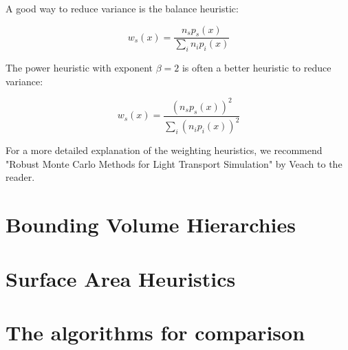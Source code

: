 A good way to reduce variance is the balance heuristic:

\begin{equation}
w_s(x) = \frac{n_s p_s(x)}{\sum_{i}n_i p_i(x)}
\end{equation}

The power heuristic with exponent $\beta = 2$ is often a better heuristic to reduce variance:

\begin{equation}
w_s(x) = \frac{(n_s p_s(x))^2}{\sum_{i}(n_i p_i(x))^2}
\end{equation}

For a more detailed explanation of the weighting heuristics, we recommend "Robust Monte Carlo Methods for Light Transport Simulation" by Veach to the reader. \cite{RMCM}

\section{Bounding Volume Hierarchies}
\label{sec:preliminaries:bvh}

\section{Surface Area Heuristics}
\label{sec:preliminaries:sah}

\section{The algorithms for comparison}
\label{sec:preliminaries:com}